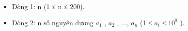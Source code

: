 \begin{itemize}
	\item     Dòng 1: n (1 ≤ n ≤ 200).   
	\item     Dòng 2: n số nguyên dương $a_{1}$    , $a_{2}$    , ..., $a_{n}$    (1 ≤ $a_{i}$    ≤ $10^{9}$    ).   
\end{itemize}